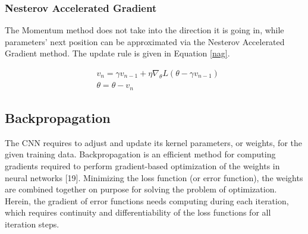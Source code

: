     \subsubsection{Nesterov Accelerated Gradient}
    The Momentum method does not take into the direction it is going in, while parameters’ next position can be approximated via the Nesterov Accelerated Gradient method. The update rule is given in Equation \ref{nag}.

    \begin{equation}
        \begin{aligned}
            & v_n = \gamma v_{n-1} + \eta \nabla_{\theta}L(\theta - \gamma v_{n-1}) \\
            & \theta= \theta - v_{n}
        \end{aligned}
        \label{nag}
    \end{equation}



    \subsection{Backpropagation}
     The CNN requires to adjust and update its kernel parameters, or weights, for the given training data. Backpropagation\cite{werbos1990backpropagation} is an efficient method for computing gradients required to perform gradient-based optimization of the weights in neural networks [19]. Minimizing the loss function (or error function), the weights are combined together on purpose for solving the problem of optimization. Herein, the gradient of error functions needs computing during each iteration, which requires continuity and differentiability of the loss functions for all iteration steps.

